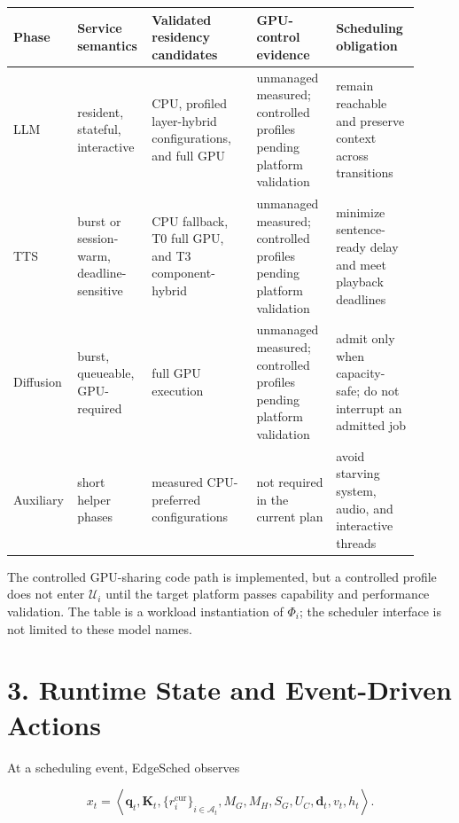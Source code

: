 \documentclass[10pt]{article}
\begin{document}
\begin{center}
\footnotesize
\setlength{\tabcolsep}{3pt}
\begin{tabular}{>{\raggedright\arraybackslash}p{0.10\linewidth}
                >{\raggedright\arraybackslash}p{0.17\linewidth}
                >{\raggedright\arraybackslash}p{0.25\linewidth}
                >{\raggedright\arraybackslash}p{0.19\linewidth}
                >{\raggedright\arraybackslash}p{0.20\linewidth}}
\toprule
Phase & Service semantics & Validated residency candidates
      & GPU-control evidence & Scheduling obligation \\
\midrule
LLM & resident, stateful, interactive
    & CPU, profiled layer-hybrid configurations, and full GPU
    & unmanaged measured; controlled profiles pending platform validation
    & remain reachable and preserve context across transitions \\
TTS & burst or session-warm, deadline-sensitive
    & CPU fallback, T0 full GPU, and T3 component-hybrid
    & unmanaged measured; controlled profiles pending platform validation
    & minimize sentence-ready delay and meet playback deadlines \\
Diffusion & burst, queueable, GPU-required
    & full GPU execution
    & unmanaged measured; controlled profiles pending platform validation
    & admit only when capacity-safe; do not interrupt an admitted job \\
Auxiliary & short helper phases
    & measured CPU-preferred configurations
    & not required in the current plan
    & avoid starving system, audio, and interactive threads \\
\bottomrule
\end{tabular}
\end{center}

The controlled GPU-sharing code path is implemented, but a controlled profile
does not enter $\mathcal U_i$ until the target platform passes capability and
performance validation.  The table is a workload instantiation of $\Phi_i$;
the scheduler interface is not limited to these model names.

\section*{3. Runtime State and Event-Driven Actions}

At a scheduling event, EdgeSched observes

\begin{equation}
x_t=\left\langle
\mathbf q_t,\mathbf K_t,
{\bigl\{r_i^{\mathrm{cur}}\bigr\}}_{i\in\mathcal A_t},
M_G,M_H,S_G,U_C,\mathbf d_t,v_t,h_t
\right\rangle .
\end{equation}
\end{document}
